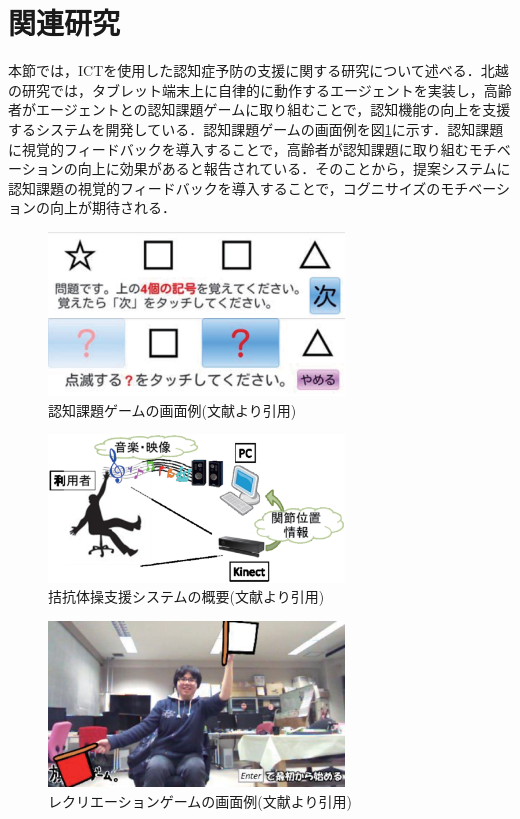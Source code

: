 \section{関連研究}
本節では，ICTを使用した認知症予防の支援に関する研究について述べる．北越の研究\cite{記憶力ゲーム}では，タブレット端末上に自律的に動作するエージェントを実装し，高齢者がエージェントとの認知課題ゲームに取り組むことで，認知機能の向上を支援するシステムを開発している．認知課題ゲームの画面例を図\ref{fig:cognition_system}に示す．認知課題に視覚的フィードバックを導入することで，高齢者が認知課題に取り組むモチベーションの向上に効果があると報告されている．そのことから，提案システムに認知課題の視覚的フィードバックを導入することで，コグニサイズのモチベーションの向上が期待される．



\begin{figure}[tbp]
	\centering
			\includegraphics[width=0.7\textwidth]{chap1-figure/cognition_system.eps}
	\caption{認知課題ゲームの画面例(文献\cite{記憶力ゲーム}より引用)}
	\label{fig:cognition_system}
\end{figure}

\begin{figure}[tbp]
	\centering
			\includegraphics[width=0.7\textwidth]{chap1-figure/antagonism_system.eps}
	\caption{拮抗体操支援システムの概要(文献より引用)}
	\label{fig:antagonism_system}
\end{figure}

\begin{figure}[tbp]
	\centering
			\includegraphics[width=0.7\textwidth]{chap1-figure/upper_limbs_system.eps}
	\caption{レクリエーションゲームの画面例(文献より引用)}
	\label{fig:upper_limbs_system}
\end{figure}


